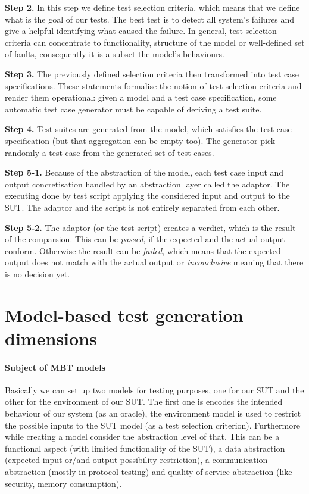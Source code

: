 \textbf{Step 2.}
In this step we define test selection criteria, which means that we define what is the goal of our tests. The best test is to detect all system's failures and give a helpful identifying what caused the failure. In general, test selection criteria can concentrate to functionality, structure of the model or well-defined set of faults, consequently it is a subset the model's behaviours.

\textbf{Step 3.}
The previously defined selection criteria then transformed into test case specifications. These statements formalise the notion of test selection criteria and render them operational: given a model and a test case specification, some automatic test case generator must be capable of deriving a test suite.

\textbf{Step 4.}
Test suites are generated from the model, which satisfies the test case specification (but that aggregation can be empty too). The generator pick randomly a test case from the generated set of test cases.

\textbf{Step 5-1.}
Because of the abstraction of the model, each test case input and output concretisation handled by an abstraction layer called the adaptor. The executing done by test script applying the considered input and output to the SUT. The adaptor and the script is not entirely separated from each other.

\textbf{Step 5-2.}
The adaptor (or the test script) creates a verdict, which is the result of the comparsion. This can be \textit{passed}, if the expected and the actual output conform. Otherwise the result can be \textit{failed}, which means that the expected output does not match with the actual output or \textit{inconclusive} meaning that there is no decision yet.

\section{Model-based test generation dimensions}
\paragraph{Subject of MBT models}
Basically we can set up two models for testing purposes, one for our SUT and the other for the environment of our SUT. The first one is encodes the intended behaviour of our system (as an oracle), the environment model is used to restrict the possible inputs to the SUT model (as a test selection criterion). Furthermore while creating a model consider the abstraction level of that. This can be a functional aspect (with limited functionality of the SUT), a data abstraction (expected input or/and output possibility restriction), a communication abstraction (mostly in protocol testing) and quality-of-service abstraction (like security, memory consumption).


